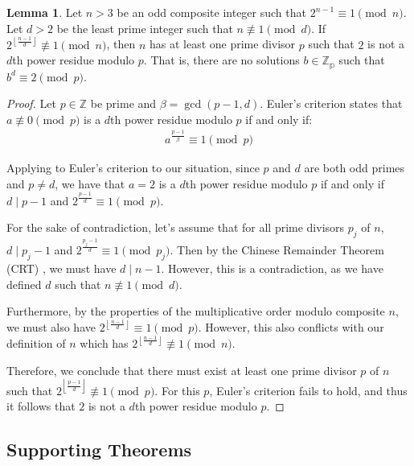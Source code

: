 \documentclass{article}
\theoremstyle{plain}
\theoremstyle{definition}
\newtheorem{lemma}{Lemma}
\newcommand{\floor}[1]{\left\lfloor #1 \right\rfloor}
\begin{document}
\begin{lemma} \label{lemma:nonresidue}
Let $n>3$ be an odd composite integer such that $2^{n-1} \equiv 1 \pmod{n}$. Let $d > 2$ be the least prime integer such that $n \not\equiv 1 \pmod{d}$. If $2^{\floor{\frac{n-1}{d}}} \not\equiv 1 \pmod{n}$, then $n$ has at least one prime divisor $p$ such that $2$ is not a $d$th power residue modulo $p$. That is, there are no solutions $b \in \mathbb{Z_p}$ such that $b^d \equiv 2 \pmod{p}$.
\end{lemma}
\begin{proof}
Let $p \in \mathbb{Z}$ be prime and $\beta = \gcd(p-1, d)$. Euler's criterion \cite{euler1914powerresidues} states that $a \not\equiv 0 \pmod p$ is a $d$th power residue modulo $p$ if and only if:
\begin{align}
a^{\frac{p-1}{\beta}} \equiv 1 \pmod p
\end{align}

Applying to Euler's criterion to our situation, since $p$ and $d$ are both odd primes and $p \not= d$, we have that $a=2$ is a $d$th power residue modulo $p$ if and only if $d \mid p-1$ and $2^{\frac{p-1}{d}} \equiv 1 \pmod p$.

For the sake of contradiction, let's assume that for all prime divisors $p_j$ of $n$, $d \mid p_j-1$ and $2^{\frac{p_j-1}{d}} \equiv 1 \pmod p_j$. Then by the Chinese Remainder Theorem (CRT) \cite{cormen2009algorithms}, we must have $d \mid n-1$. However, this is a contradiction, as we have defined $d$ such that $n \not\equiv 1 \pmod{d}$.

Furthermore, by the properties of the multiplicative order modulo composite $n$, we must also have $2^{\floor{\frac{n-1}{d}}} \equiv 1 \pmod p$. However, this also conflicts with our definition of $n$ which has $2^{\floor{\frac{n-1}{d}}} \not\equiv 1 \pmod n$.

Therefore, we conclude that there must exist at least one prime divisor $p$ of $n$ such that $2^{\floor{\frac{p-1}{d}}} \not\equiv 1 \pmod{p}$. For this $p$, Euler's criterion fails to hold, and thus it follows that $2$ is not a $d$th power residue modulo $p$.
\end{proof}

\subsection{Supporting Theorems}
\end{document}
